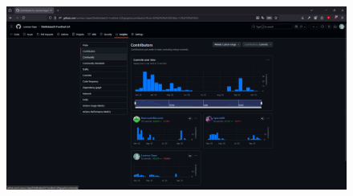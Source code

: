 \begin{figure}[H]
	\centering
	\includegraphics[width=1\linewidth]{"Immagini/Resoconto Commit FE.png"}
	\caption[Resoconto Commit Frontend]{}
	\label{fig:resoconto-commit-frontend}
\end{figure}
\newpage
